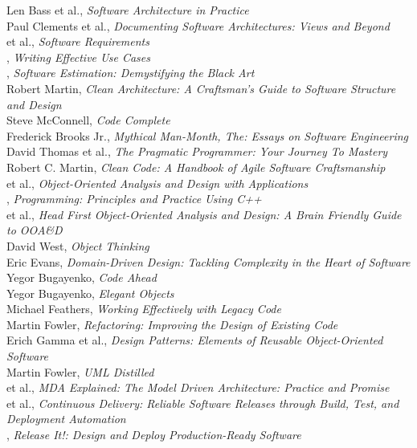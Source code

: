 \documentclass[nobrand,anonymous,nodate,nosecurity]{huawei}
\begin{document}
\begin{multicols}{2}\small\raggedright
Len Bass et al., \emph{Software Architecture in Practice}\\[3pt]
Paul Clements et al., \emph{Documenting Software Architectures: Views and Beyond}\\[3pt]
 et al., \emph{Software Requirements}\\[3pt]
{}, \emph{Writing Effective Use Cases}\\[3pt]
{}, \emph{Software Estimation: Demystifying the Black Art}\\[3pt]
{Robert Martin}, \emph{Clean Architecture: A Craftsman's Guide to Software Structure and Design}\\[3pt]
{Steve McConnell}, \emph{Code Complete}\\[3pt]
{Frederick Brooks Jr.}, \emph{Mythical Man-Month, The: Essays on Software Engineering}\\[3pt]
{David Thomas et al.}, \emph{The Pragmatic Programmer: Your Journey To Mastery}\\[3pt]
{Robert C. Martin}, \emph{Clean Code: A Handbook of Agile Software Craftsmanship}\\[3pt]
{ et al.}, \emph{Object-Oriented Analysis and Design with Applications}\\[3pt]
{}, \emph{Programming: Principles and Practice Using C++}\\[3pt]
{ et al.}, \emph{Head First Object-Oriented Analysis and Design: A Brain Friendly Guide to OOA\&D}\\[3pt]
{David West}, \emph{Object Thinking}\\[3pt]
{Eric Evans}, \emph{Domain-Driven Design: Tackling Complexity in the Heart of Software}\\[3pt]
{Yegor Bugayenko}, \emph{Code Ahead}\\[3pt]
{Yegor Bugayenko}, \emph{Elegant Objects}\\[3pt]
{Michael Feathers}, \emph{Working Effectively with Legacy Code}\\[3pt]
{Martin Fowler}, \emph{Refactoring: Improving the Design of Existing Code}\\[3pt]
{Erich Gamma et al.}, \emph{Design Patterns: Elements of Reusable Object-Oriented Software}\\[3pt]
{Martin Fowler}, \emph{UML Distilled}\\[3pt]
{ et al.}, \emph{MDA Explained: The Model Driven Architecture: Practice and Promise}\\[3pt]
{ et al.}, \emph{Continuous Delivery: Reliable Software Releases through Build, Test, and Deployment Automation}\\[3pt]
{}, \emph{Release It!: Design and Deploy Production-Ready Software}\\[3pt]
\end{multicols}
\end{document}
